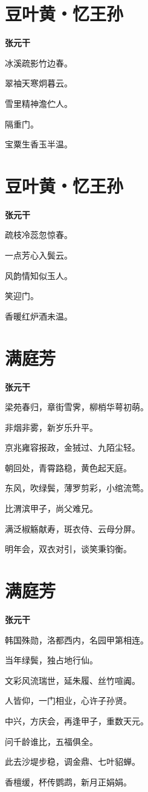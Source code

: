 \documentclass[12pt,a4paper]{ctexbook}
\begin{document}
\section{豆叶黄・忆王孙}
\textbf{张元干}\par\vspace{0.5em}
冰溪疏影竹边春。\par
翠袖天寒炯暮云。\par
雪里精神澹伫人。\par
隔重门。\par
宝粟生香玉半温。\par

\section{豆叶黄・忆王孙}
\textbf{张元干}\par\vspace{0.5em}
疏枝冷蕊忽惊春。\par
一点芳心入鬓云。\par
风韵情知似玉人。\par
笑迎门。\par
香暖红炉酒未温。\par

\section{满庭芳}
\textbf{张元干}\par\vspace{0.5em}
梁苑春归，章街雪霁，柳梢华萼初萌。\par
非烟非雾，新岁乐升平。\par
京兆雍容报政，金狨过、九陌尘轻。\par
朝回处，青霄路稳，黄色起天庭。\par
东风，吹绿鬓，薄罗剪彩，小绾流莺。\par
比渭滨甲子，尚父难兄。\par
满泛椒觞献寿，斑衣侍、云母分屏。\par
明年会，双衣对引，谈笑秉钧衡。\par

\section{满庭芳}
\textbf{张元干}\par\vspace{0.5em}
韩国殊勋，洛都西内，名园甲第相连。\par
当年绿鬓，独占地行仙。\par
文彩风流瑞世，延朱履、丝竹喧阗。\par
人皆仰，一门相业，心许子孙贤。\par
中兴，方庆会，再逢甲子，重数天元。\par
问千龄谁比，五福俱全。\par
此去沙堤步稳，调金鼎、七叶貂蝉。\par
香檀缓，杯传鹦鹉，新月正娟娟。\par
\end{document}
